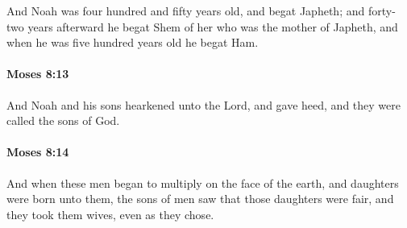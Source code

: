 			And Noah was four hundred and fifty years old, and begat Japheth; and forty-two years afterward he begat Shem of her who was the mother of Japheth, and when he was five hundred years old he begat Ham.


		\paragraph{Moses 8:13} %
			\label{MOSES-8-13}

			And Noah and his sons hearkened unto the Lord, and gave heed, and they were called the sons of God.


		\paragraph{Moses 8:14} %
			\label{MOSES-8-14}

			And when these men began to multiply on the face of the earth, and daughters were born unto them, the sons of men saw that those daughters were fair, and they took them wives, even as they chose.


